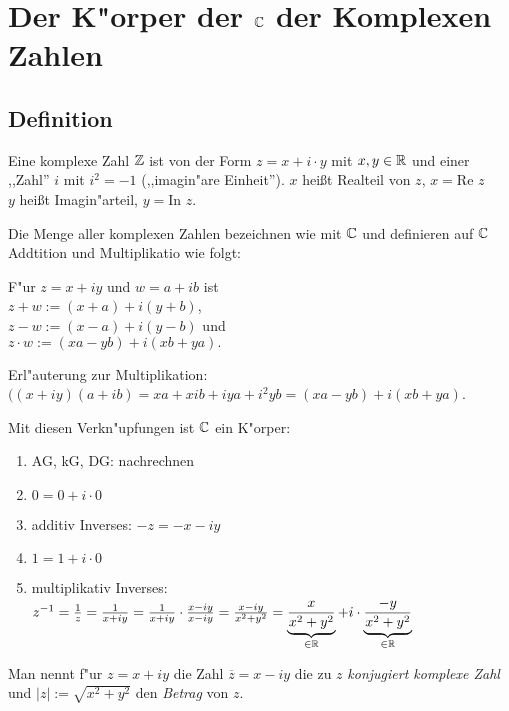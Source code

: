 \section{Der K"orper der $\mathbb{C}$ der Komplexen Zahlen} 

\subsection{Definition}
Eine komplexe Zahl $\mathbb{Z}$ ist von der Form $z=x+i\cdot y$ mit $x, y \in \mathbb{R}$ und einer ,,Zahl'' $i$ mit $i^2=-1$ (,,imagin"are Einheit''). $x$ heißt Realteil von $z$, $x=$Re $z$\\
$y$ heißt Imagin"arteil, $y=$In $z$.

Die Menge aller komplexen Zahlen bezeichnen wie mit $\mathbb{C}$ und definieren auf $\mathbb{C}$ Addtition und Multiplikatio wie folgt:

F"ur $z=x+iy$ und $w=a+ib$ ist \\$z+w:= (x+a) + i (y+b)$, \\$z-w:= (x-a) + i (y-b)$ und \\$z\cdot w:= (xa-yb) + i(xb+ya).$

Erl"auterung zur Multiplikation: $((x+iy)(a+ib) = xa + xib + iya + i^2yb = (xa-yb) + i(xb+ya)$.

Mit diesen Verkn"upfungen ist $\mathbb{C}$ ein K"orper:
\begin{enumerate}
	\item
	AG, kG, DG: nachrechnen
	\item
	$0=0+i\cdot 0$
	\item
	additiv Inverses: $-z = -x-iy$
	\item
	$1=1+i\cdot 0$
	\item
	multiplikativ Inverses: $z^{-1}= \frac{1}{z}= \frac{1}{x+iy}=\frac{1}{x+iy}\cdot\frac{x-iy}{x-iy}= \frac{x-iy}{x^2+y^2}=\underbrace{\frac{x}{x^2+y^2}}_{\in \mathbb{R}}+ i \cdot \underbrace{\frac{-y}{x^2+y^2}}_{\in \mathbb{R}}$
\end{enumerate}
	Man nennt f"ur $z=x+iy$ die Zahl $ \overline{z} = x-iy$ die zu $z$ \emph{konjugiert komplexe Zahl} und $|z| := \sqrt{x^2+y^2}$ den \emph{Betrag} von $z$.

